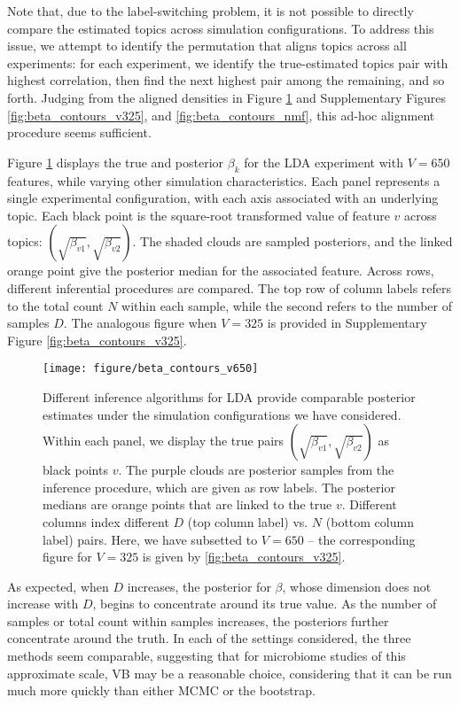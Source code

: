 \documentclass[oupdraft]{bio}
\begin{document}
Note that, due to the label-switching problem, it is not possible to directly
compare the estimated topics across simulation configurations. To address this
issue, we attempt to identify the permutation that aligns topics across all
experiments: for each experiment, we identify the true-estimated topics pair
with highest correlation, then find the next highest pair among the remaining,
and so forth. Judging from the aligned densities in Figure
\ref{fig:beta_contours_v650} and Supplementary Figures
\ref{fig:beta_contours_v325}, and \ref{fig:beta_contours_nmf}, this ad-hoc
alignment procedure seems sufficient.

Figure \ref{fig:beta_contours_v650} displays the true and posterior $\beta_{k}$
for the LDA experiment with $V = 650$ features, while varying other simulation
characteristics. Each panel represents a single experimental configuration, with
each axis associated with an underlying topic. Each black point is the
square-root transformed value of feature $v$ across topics:
$\left(\sqrt{\beta_{v1}}, \sqrt{\beta_{v2}}\right)$. The shaded clouds are
sampled posteriors, and the linked orange point give the posterior median for the
associated feature. Across rows, different inferential procedures are compared.
The top row of column labels refers to the total count $N$ within each sample,
while the second refers to the number of samples $D$. The analogous figure when
$V = 325$ is provided in Supplementary Figure \ref{fig:beta_contours_v325}.

\begin{figure}[!p]
  \centering\texttt{[image: figure/beta\_contours\_v650]}
  \caption{Different inference algorithms for LDA provide comparable posterior
    estimates under the simulation configurations we have considered. Within
    each panel, we display the true pairs $\left(\sqrt{\beta_{v1}},
    \sqrt{\beta_{v2}}\right)$ as black points $v$. The purple clouds are
    posterior samples from the inference procedure, which are given as row
    labels. The posterior medians are orange points that are linked to the true
    $v$. Different columns index different $D$ (top column label) vs. $N$
    (bottom column label) pairs. Here, we have subsetted to $V = 650$ -- the
    corresponding figure for $V = 325$ is given by \ref{fig:beta_contours_v325}.
  }
  \label{fig:beta_contours_v650}
\end{figure}


As expected, when $D$ increases, the posterior for $\beta$, whose dimension does
not increase with $D$, begins to concentrate around its true value. As the
number of samples or total count within samples increases, the posteriors
further concentrate around the truth. In each of the settings considered, the
three methods seem comparable, suggesting that for microbiome studies of this
approximate scale, VB may be a reasonable choice, considering that it can be run
much more quickly than either MCMC or the bootstrap.
\end{document}
